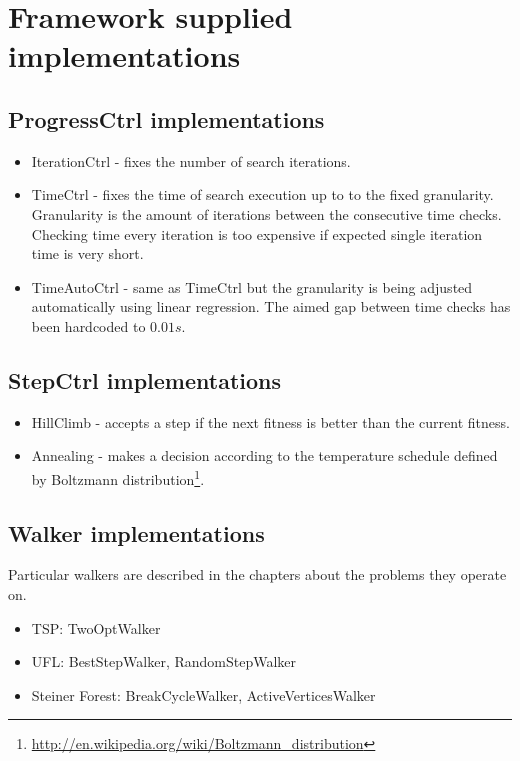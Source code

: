 \section{Framework supplied implementations}

\subsection{ProgressCtrl implementations}
\begin{itemize}
\item IterationCtrl - fixes the number of search iterations.
\item TimeCtrl - fixes the time of search execution up to to the fixed granularity.
	Granularity is the amount of iterations between the consecutive time checks.
	Checking time every iteration is too expensive if expected single iteration time
	is very short.
\item TimeAutoCtrl - same as TimeCtrl but the granularity is being adjusted
	automatically using linear regression. The aimed gap between time checks has
	been hardcoded to $0.01s$.
\end{itemize}

\subsection{StepCtrl implementations}
\begin{itemize}
\item HillClimb - accepts a step if the next fitness is better than the current fitness.
\item Annealing - makes a decision according to the temperature schedule defined by
	\mbox{Boltzmann} distribution\footnote{\url{http://en.wikipedia.org/wiki/Boltzmann_distribution}}.
\end{itemize}

\subsection{Walker implementations}
Particular walkers are described in the chapters about the problems they operate on.
\begin{itemize}
\item TSP: TwoOptWalker
\item UFL: BestStepWalker, RandomStepWalker
\item Steiner Forest: BreakCycleWalker, ActiveVerticesWalker
\end{itemize}


